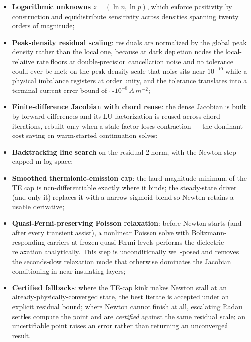\documentclass[
  11pt,
  american,
]{report}
\providecommand{\tightlist}{%
  \setlength{\itemsep}{0pt}\setlength{\parskip}{0pt}}
\begin{document}
\begin{itemize}
\tightlist
\item
  \textbf{Logarithmic unknowns} \(z = (\ln n, \ln p)\), which enforce
  positivity by construction and equidistribute sensitivity across
  densities spanning twenty orders of magnitude;
\item
  \textbf{Peak-density residual scaling}: residuals are normalized by
  the global peak density rather than the local one, because at dark
  depletion nodes the local-relative rate floors at double-precision
  cancellation noise and no tolerance could ever be met; on the
  peak-density scale that noise sits near \(10^{-10}\) while a physical
  imbalance registers at order unity, and the tolerance translates into
  a terminal-current error bound of \(\sim 10^{-8}\,A\,m^{-2}\);
\item
  \textbf{Finite-difference Jacobian with chord reuse}: the dense
  Jacobian is built by forward differences and its LU factorization is
  reused across chord iterations, rebuilt only when a stale factor loses
  contraction --- the dominant cost saving on warm-started continuation
  solves;
\item
  \textbf{Backtracking line search} on the residual 2-norm, with the
  Newton step capped in log space;
\item
  \textbf{Smoothed thermionic-emission cap}: the hard magnitude-minimum
  of the TE cap is non-differentiable exactly where it binds; the
  steady-state driver (and only it) replaces it with a narrow sigmoid
  blend so Newton retains a usable derivative;
\item
  \textbf{Quasi-Fermi-preserving Poisson relaxation}: before Newton
  starts (and after every transient assist), a nonlinear Poisson solve
  with Boltzmann-responding carriers at frozen quasi-Fermi levels
  performs the dielectric relaxation analytically. This step is
  unconditionally well-posed and removes the seconds-slow relaxation
  mode that otherwise dominates the Jacobian conditioning in
  near-insulating layers;
\item
  \textbf{Certified fallbacks}: where the TE-cap kink makes Newton stall
  at an already-physically-converged state, the best iterate is accepted
  under an explicit residual bound; where Newton cannot finish at all,
  escalating Radau settles compute the point and are \emph{certified}
  against the same residual scale; an uncertifiable point raises an
  error rather than returning an unconverged result.
\end{itemize}
\end{document}
